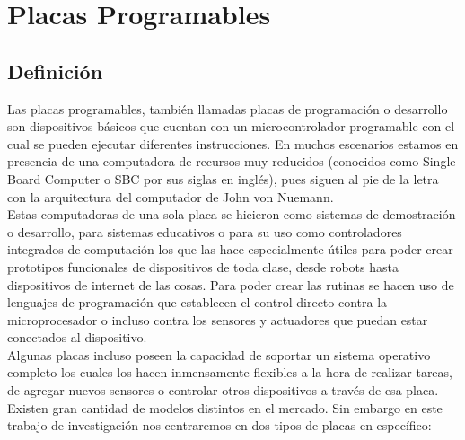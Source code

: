 

\chapter{Placas Programables}

\section{Definición}
Las placas programables, también llamadas placas de programación o desarrollo son dispositivos básicos que cuentan con un microcontrolador programable con el cual se pueden ejecutar diferentes instrucciones. En muchos escenarios estamos en presencia de una computadora de recursos muy reducidos (conocidos como Single Board Computer o SBC por sus siglas en inglés), pues siguen al pie de la letra con la arquitectura del computador de John von Nuemann\cite{arquitecturaComputador}.\\ 

Estas computadoras de una sola placa se hicieron como sistemas de demostración o desarrollo, para sistemas educativos o para su uso como controladores integrados de computación los que las hace especialmente útiles para poder crear prototipos funcionales de dispositivos de toda clase, desde robots hasta dispositivos de internet de las cosas. Para poder crear las rutinas se hacen uso de lenguajes de programación que establecen el control directo contra la microprocesador o incluso contra los sensores y actuadores que puedan estar conectados al dispositivo.\\

Algunas placas incluso poseen la capacidad de soportar un sistema operativo completo los cuales los hacen inmensamente flexibles a la hora de realizar tareas, de agregar nuevos sensores o controlar otros dispositivos a través de esa placa. Existen gran cantidad de modelos distintos en el mercado. Sin embargo en este trabajo de investigación nos centraremos en dos tipos de placas en específico:

